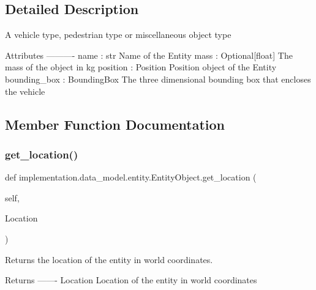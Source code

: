\subsection{Detailed Description}
\begin{DoxyVerb}A vehicle type, pedestrian type or miscellaneous object type

 Attributes
 ----------
 name : str
    Name of the Entity
mass : Optional[float]
    The mass of the object in kg
position : Position
    Position object of the Entity
bounding_box : BoundingBox
    The three dimensional bounding box that encloses the vehicle
\end{DoxyVerb}
 

\subsection{Member Function Documentation}
\mbox{\label{classimplementation_1_1data__model_1_1entity_1_1_entity_object_a5daf332215d128db4067cb3d57708fd7}} 
\subsubsection{\texorpdfstring{get\+\_\+location()}{get\_location()}}
{\footnotesize\ttfamily def implementation.\+data\+\_\+model.\+entity.\+Entity\+Object.\+get\+\_\+location (\begin{DoxyParamCaption}\item[{}]{self,  }\item[{}]{Location }\end{DoxyParamCaption})}

\begin{DoxyVerb}Returns the location of the entity in world coordinates.

Returns
-------
Location
    Location of the entity in world coordinates
\end{DoxyVerb}
 \mbox{\label{classimplementation_1_1data__model_1_1entity_1_1_entity_object_af4e061592d0d6ee3d191faace28ab781}} 
